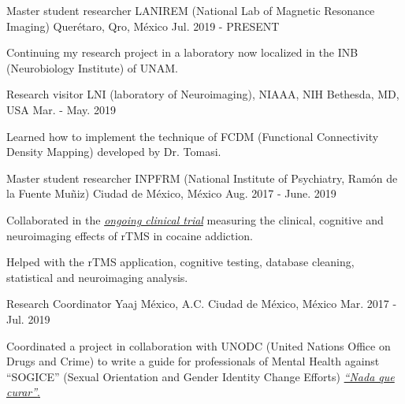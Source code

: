 \vspace{-3.2mm}
\vspace{-1.5mm}
\begin{cventries}
    \cventry
        {Master student researcher}
        {LANIREM (National Lab of Magnetic Resonance Imaging)}
        {Querétaro, Qro, México}
        {Jul. 2019 - PRESENT}
        {
            \begin{cvitems}
                \item {Continuing my research project in a laboratory now localized in the INB (Neurobiology Institute) of UNAM.}
            \end{cvitems}
        }
    \cventry
        {Research visitor}
        {LNI (laboratory of Neuroimaging), NIAAA, NIH}
        {Bethesda, MD, USA}
        {Mar. - May. 2019}
        {
            \begin{cvitems}
                \item {Learned how to implement the technique of FCDM (Functional Connectivity Density Mapping) developed by Dr. Tomasi.}
            \end{cvitems}
        }
    \cventry
        {Master student researcher}
        {INPFRM (National Institute of Psychiatry, Ramón de la Fuente Muñiz)}
        {Ciudad de México, México}
        {Aug. 2017 - June. 2019}
        {
            \begin{cvitems}
            \item {Collaborated in the \href{https://clinicaltrials.gov/ct2/show/study/NCT02986438?term=Jorge+Gonzalez-Olvera&cntry=MX&rank=2}{\textit{ongoing clinical trial}} measuring the clinical, cognitive and neuroimaging effects of rTMS in cocaine addiction.}
            \item {Helped with the rTMS application, cognitive testing, database cleaning, statistical and neuroimaging analysis.}
            \end{cvitems}
        }
    \cventry
        {Research Coordinator}
        {Yaaj México, A.C.}
        {Ciudad de México, México}
        {Mar. 2017 - Jul. 2019}
        {
            \begin{cvitems}
            \item {Coordinated a project in collaboration with UNODC (United Nations Office on Drugs and Crime) to write a guide for professionals of Mental Health against ``SOGICE'' (Sexual Orientation and Gender Identity Change Efforts) \href{https://www.unodc.org/documents/mexicoandcentralamerica/2019/GUIAECOSIGFINAL-compressed.pdf}{\textit{``Nada que curar''}.}}

\end{cvitems}}
\end{cventries}
